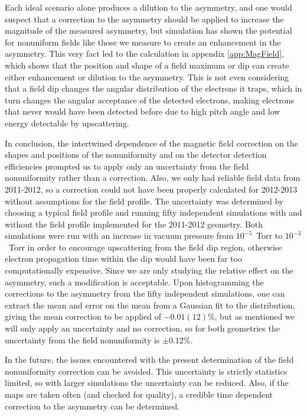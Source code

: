 Each ideal scenario alone produces a dilution to the asymmetry, and one would suspect that a
correction to the asymmetry should be applied to increase the magnitude of the measured asymmetry,
but simulation has shown the potential for nonuniform fields like those we measure to create an
enhancement in the asymmetry. This very fact led to the calculation in appendix \ref{app:MagField},
which shows that the position and shape of a field maximum or dip can create either
enhancement or dilution to the asymmetry. This is not even considering that a field dip changes
the angular distribution of the electrons it traps, which in turn changes the angular
acceptance of the detected electrons, making electrons that never would have been detected before
due to high pitch angle and low energy detectable by upscattering.

In conclusion, the intertwined dependence of the magnetic field correction on the shapes and
positions of the nonuniformity and on the detector detection efficiencies prompted us to apply
only an uncertainty from the field nonuniformity rather than a correction. Also, we only had
reliable field data from 2011-2012, so a correction could not have been properly calculated for
2012-2013 without assumptions for the field profile. The uncertainty was
determined by choosing a typical field profile and running fifty independent simulations with and
without the field profile implemented for the 2011-2012 geometry.
Both simulations were run with an increase in vacuum
pressure from $10^{-5}$~Torr to $10^{-3}$~Torr in order to encourage upscattering from the
field dip region, otherwise electron propagation time within the dip would have been far
too computationally expensive. Since we are only studying the relative effect on the asymmetry,
such a modification is acceptable. Upon histogramming the corrections to the asymmetry from
the fifty independent simulations, one can extract the mean and error on the mean from a Gaussian
fit to the distribution, giving the mean correction to be applied of $-0.01(12)\%$, but as mentioned
we will only apply an uncertainty and no correction, so for both geometries the uncertainty from
the field nonuniformity is $\pm0.12\%$. 

In the future, the issues encountered with the present determination of the field nonuniformity
correction can be avoided. This uncertainty is strictly statistics limited, so with
larger simulations the uncertainty can be reduced. Also, if the maps are taken often (and checked
for quality), a credible time dependent correction to the asymmetry can be determined.




